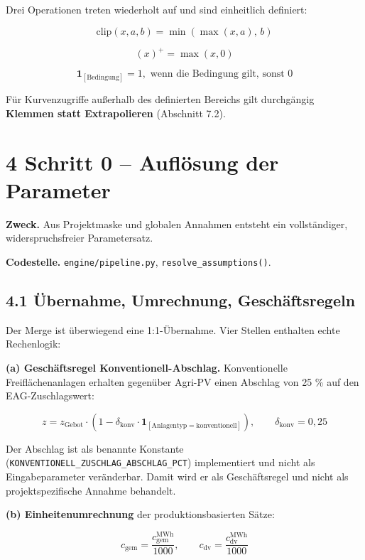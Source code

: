 \documentclass[
  a4paper,
  10pt]{article}
\begin{document}
Drei Operationen treten wiederholt auf und sind einheitlich definiert:

\[ \mathrm{clip}(x, a, b) = \min\left(\max(x, a),\, b\right) \]

\[ (x)^{+} = \max(x, 0) \]

\[ \mathbf{1}_{[\text{Bedingung}]} = 1, \text{ wenn die Bedingung gilt, sonst } 0 \]

Für Kurvenzugriffe außerhalb des definierten Bereichs gilt durchgängig
\textbf{Klemmen statt Extrapolieren} (Abschnitt 7.2).

\hypertarget{schritt-0-aufluxf6sung-der-parameter}{%
\section{4 Schritt 0 -- Auflösung der
Parameter}\label{schritt-0-aufluxf6sung-der-parameter}}

\textbf{Zweck.} Aus Projektmaske und globalen Annahmen entsteht ein
vollständiger, widerspruchsfreier Parametersatz.

\textbf{Codestelle.} \nolinkurl{engine/pipeline.py},
\texttt{resolve\_assumptions()}.

\hypertarget{uxfcbernahme-umrechnung-geschuxe4ftsregeln}{%
\subsection{4.1 Übernahme, Umrechnung,
Geschäftsregeln}\label{uxfcbernahme-umrechnung-geschuxe4ftsregeln}}

Der Merge ist überwiegend eine 1:1-Übernahme. Vier Stellen enthalten
echte Rechenlogik:

\textbf{(a) Geschäftsregel Konventionell-Abschlag.} Konventionelle
Freiflächenanlagen erhalten gegenüber Agri-PV einen Abschlag von 25 \%
auf den EAG-Zuschlagswert:

\[ z = z_{\mathrm{Gebot}} \cdot \left(1 - \delta_{\mathrm{konv}} \cdot \mathbf{1}_{[\text{Anlagentyp} = \text{konventionell}]}\right), \qquad \delta_{\mathrm{konv}} = 0{,}25 \]

Der Abschlag ist als benannte Konstante
(\texttt{KONVENTIONELL\_ZUSCHLAG\_ABSCHLAG\_PCT}) implementiert und
nicht als Eingabeparameter veränderbar. Damit wird er als Geschäftsregel
und nicht als projektspezifische Annahme behandelt.

\textbf{(b) Einheitenumrechnung} der produktionsbasierten Sätze:

\[ c_{\mathrm{gem}} = \frac{c^{\mathrm{MWh}}_{\mathrm{gem}}}{1000}, \qquad c_{\mathrm{dv}} = \frac{c^{\mathrm{MWh}}_{\mathrm{dv}}}{1000} \]
\end{document}
